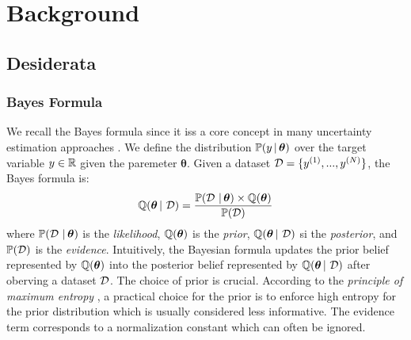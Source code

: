 \chapter{Background}
\label{chap:background}

\section{Desiderata}

\subsection{Bayes Formula} We recall the Bayes formula since it iss a core concept in many uncertainty estimation approaches .
We define the distribution $\mathbb{P}(y \,|\, \bm{\theta})$ over the target variable $y \in \operatorname{\mathbb{R}}$ given the paremeter $\bm{\theta}$.
Given a dataset $\operatorname{\mathcal{D}}=\{y^{(1)}, ..., y^{(N)}\}$, the Bayes formula is:
\begin{equation}
    \operatorname{\mathbb{Q}}(\bm{\theta} \,|\, \operatorname{\mathcal{D}}) = \frac{\mathbb{P}(\operatorname{\mathcal{D}} \,|\, \bm{\theta}) \times \operatorname{\mathbb{Q}}(\bm{\theta})}{\mathbb{P}(\operatorname{\mathcal{D}})}
\end{equation}
where $\mathbb{P}(\operatorname{\mathcal{D}} \,|\, \bm{\theta})$ is the \emph{likelihood}, $\operatorname{\mathbb{Q}}(\bm{\theta})$ is the \emph{prior}, $\operatorname{\mathbb{Q}}(\bm{\theta} \,|\, \operatorname{\mathcal{D}})$ si the \emph{posterior}, and $\mathbb{P}(\operatorname{\mathcal{D}})$ is the \emph{evidence}.
Intuitively, the Bayesian formula updates the prior belief represented by $\operatorname{\mathbb{Q}}(\bm{\theta})$ into the posterior belief represented by $\operatorname{\mathbb{Q}}(\bm{\theta} \,|\, \operatorname{\mathcal{D}})$ after oberving a dataset $\operatorname{\mathcal{D}}$.
The choice of prior is crucial. According to the \emph{principle of maximum entropy} \citep{maximum-entropy-principle}, a practical choice for the prior is to enforce high entropy for the prior distribution which is usually considered less informative. 
The evidence term corresponds to a normalization constant which can often be ignored.

